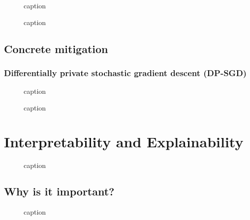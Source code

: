 \documentclass[11pt]{article}
\begin{document}
\begin{figure}[H]
    \centering
    \caption{caption}
\end{figure}

\begin{figure}[H]
    \centering
    \caption{caption}
\end{figure}

\subsection{Concrete mitigation}

\subsubsection{Differentially private stochastic gradient descent (DP-SGD)}

\begin{figure}[H]
    \centering
    \caption{caption}
\end{figure}

\begin{figure}[H]
    \centering
    \caption{caption}
\end{figure}

\section{Interpretability and Explainability}

\begin{figure}[H]
    \centering
    \caption{caption}
\end{figure}

\subsection{Why is it important?}

\begin{figure}[H]
    \centering
    \caption{caption}
\end{figure}
\end{document}
